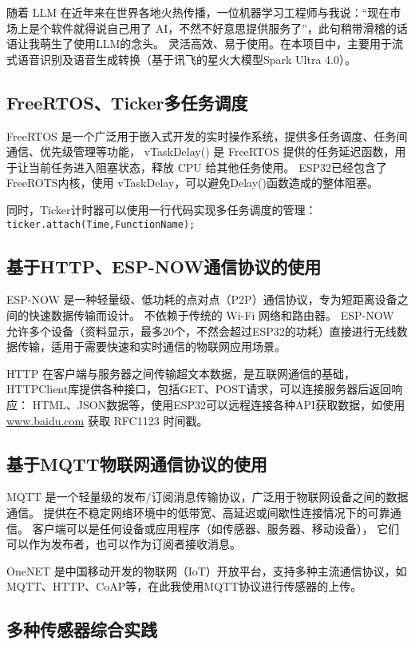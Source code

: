 随着 LLM 在近年来在世界各地火热传播，一位机器学习工程师与我说：“现在市场上是个软件就得说自己用了 AI，不然不好意思提供服务了”，此句稍带滑稽的话语让我萌生了使用LLM的念头。
灵活高效、易于使用。在本项目中，主要用于流式语音识别及语音生成转换（基于讯飞的星火大模型Spark Ultra 4.0）。

\subsection{FreeRTOS、Ticker多任务调度}

FreeRTOS 是一个广泛用于嵌入式开发的实时操作系统，提供多任务调度、任务间通信、优先级管理等功能，
vTaskDelay() 是 FreeRTOS 提供的任务延迟函数，用于让当前任务进入阻塞状态，释放 CPU 给其他任务使用。
ESP32已经包含了FreeROTS内核，使用 vTaskDelay，可以避免Delay()函数造成的整体阻塞。

同时，Ticker计时器可以使用一行代码实现多任务调度的管理：\texttt{ticker.attach(Time,FunctionName);}

\subsection{基于HTTP、ESP-NOW通信协议的使用}

ESP-NOW 是一种轻量级、低功耗的点对点（P2P）通信协议，专为短距离设备之间的快速数据传输而设计。
不依赖于传统的 Wi-Fi 网络和路由器。
ESP-NOW 允许多个设备（资料显示，最多20个，不然会超过ESP32的功耗）直接进行无线数据传输，适用于需要快速和实时通信的物联网应用场景。

HTTP 在客户端与服务器之间传输超文本数据，是互联网通信的基础，HTTPClient库提供各种接口，包括GET、POST请求，可以连接服务器后返回响应：
HTML、JSON数据等，使用ESP32可以远程连接各种API获取数据，如使用\underline{www.baidu.com} 获取 RFC1123 时间戳。

\subsection{基于MQTT物联网通信协议的使用}

MQTT 是一个轻量级的发布/订阅消息传输协议，广泛用于物联网设备之间的数据通信。
提供在不稳定网络环境中的低带宽、高延迟或间歇性连接情况下的可靠通信。
客户端可以是任何设备或应用程序（如传感器、服务器、移动设备），
它们可以作为发布者，也可以作为订阅者接收消息。

OneNET 是中国移动开发的物联网（IoT）开放平台，支持多种主流通信协议，如MQTT、HTTP、CoAP等，在此我使用MQTT协议进行传感器的上传。

\subsection{多种传感器综合实践}

